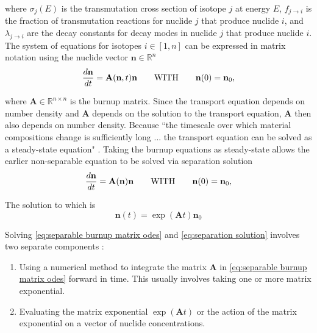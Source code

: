 \documentclass[letterpaper]{physor2024}
\begin{document}
\noindent where $\sigma_{j}(E)$ is the transmutation cross section of isotope $j$ at energy $E$, $f_{j\rightarrow{i}}$ is the fraction of transmutation reactions for nuclide $j$ that produce nuclide $i$, and $\lambda_{j\rightarrow{i}}$ are the decay constants for decay modes in nuclide $j$ that produce nuclide $i$. The system of equations for isotopes $i\in[1,n]$ can be expressed in matrix notation using the nuclide vector $\mathbf{n}\in\mathbb{R}^{n}$
\begin{equation} \label{eq:burnup matrix odes}
    \frac{d\textbf{n}}{dt} =
    \textbf{A}(\textbf{n},t) \textbf{n}
    \qquad \text{WITH} \qquad
    \textbf{n}(0) = \textbf{n}_{0},
\end{equation}

\noindent where $\textbf{A}\in\mathbb{R}^{n\times n}$ is the burnup matrix. Since the transport equation depends on number density and $\textbf{A}$ depends on the solution to the transport equation, $\textbf{A}$ then also depends on number density. Because ``the timescale over which material compositions change is sufficiently long ... the transport equation can be solved as a steady-state equation" \cite{romano-depletion-2021}. Taking the burnup equations as steady-state allows the earlier non-separable equation to be solved via separation solution
\begin{equation} \label{eq:separable burnup matrix odes}
    \frac{d\textbf{n}}{dt} =
    \textbf{A}(\textbf{n}) \textbf{n}
    \qquad \text{WITH} \qquad
    \textbf{n}(0) = \textbf{n}_{0},
\end{equation}

\noindent The solution to which is
\begin{equation} \label{eq:separation solution}
     \textbf{n}(t) = \exp(\textbf{A}t) \textbf{n}_{0}
\end{equation}

\noindent Solving \cref{eq:separable burnup matrix odes} and \cref{eq:separation solution} involves two separate components \cite{romano-depletion-2021}:
\begin{enumerate}
    \item Using a numerical method to integrate the matrix $\textbf{A}$ in \cref{eq:separable burnup matrix odes} forward in time. This usually involves taking one or more matrix exponential.
    \item Evaluating the matrix exponential $\exp(\textbf{A}t)$ or the action of the matrix exponential on a vector of nuclide concentrations.
\end{enumerate}
\end{document}
